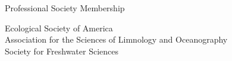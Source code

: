 \documentclass{resume} %
\begin{document}
\bigskip

\begin{rSection}{Professional Society Membership}

Ecological Society of America\\
Association for the Sciences of Limnology and Oceanography\\
Society for Freshwater Sciences\\

\end{rSection}

%
%
%
%
\end{document}
